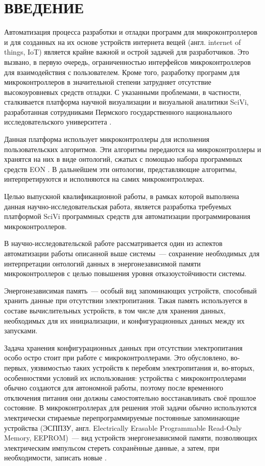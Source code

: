 \chapter*{ВВЕДЕНИЕ}

Автоматизация процесса разработки и отладки программ для микроконтроллеров и для созданных на их основе устройств интернета вещей (англ. internet of things, IoT) является крайне важной и острой задачей для разработчиков.
Это вызвано, в первую очередь, ограниченностью интерфейсов микроконтроллеров для взаимодействия с пользователем.
Кроме того, разработку программ для микроконтроллеров в значительной степени затрудняет отсутствие высокоуровневых средств отладки.
С указанными проблемами, в частности, сталкивается платформа научной визуализации и визуальной аналитики SciVi, разработанная сотрудниками Пермского государственного национального исследовательского университета \cite{article:scivi, article:scivi-overview}.

Данная платформа использует микроконтроллеры для исполнения пользовательских алгоритмов.
Эти алгоритмы передаются на микроконтроллеры и хранятся на них в виде онтологий, сжатых с помощью набора программных средств EON \cite{incollection:eon-main, booktel:eon-communications}.
В дальнейшем эти онтологии, представляющие алгоритмы, интерпретируются и исполняются на самих микроконтроллерах.

Целью выпускной квалификационной работы, в рамках которой выполнена данная научно-исследовательская работа, является разработка требуемых платформой SciVi программных средств для автоматизации программирования микроконтроллеров.

В научно-исследовательской работе рассматривается один из аспектов автоматизации работы описанной выше системы~--- сохранение необходимых для интерпретации онтологий данных в энергонезависимой памяти микроконтроллеров с целью повышения уровня отказоустойчивости системы.

Энергонезависимая память~--- особый вид запоминающих устройств, способный хранить данные при отсутствии электропитания.
Такая память используется в составе вычислительных устройств, в том числе для хранения данных, необходимых для их инициализации, и конфигурационных данных между их запусками.

Задача хранения конфигурационных данных при отсутствии электропитания особо остро стоит при работе с микроконтроллерами.
Это обусловлено, во-первых, уязвимостью таких устройств к перебоям электропитания и, во-вторых, особенностями условий их использования: устройства с микроконтроллерами обычно создаются для автономной работы, поэтому после временного отключения питания они должны самостоятельно восстанавливать своё прошлое состояние.
В микроконтроллерах для решения этой задачи обычно используются электрически стираемые перепрограммируемые постоянные запоминающие устройства (ЭСППЗУ, англ. Electrically Erasable Programmable Read-Only Memory, EEPROM)~--- вид устройств энергонезависимой памяти, позволяющих электрическим импульсом стереть сохранённые данные, а затем, при необходимости, записать новые \cite{incollection:eeprom-proposal, article:eeprom}.

